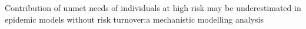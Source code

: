 Contribution of unmet needs of individuals at high risk
may be underestimated in epidemic models without risk turnover:\linebreak[1]
a mechanistic modelling analysis